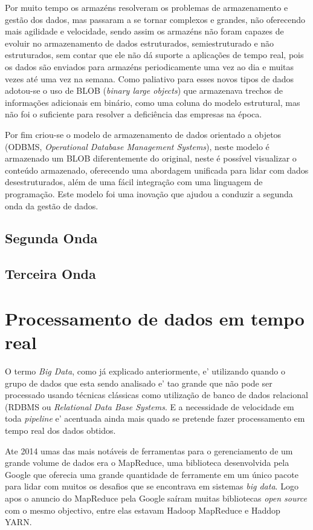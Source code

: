 Por muito tempo os armazéns resolveram os problemas de armazenamento e gestão dos dados, mas passaram a se tornar complexos e grandes, não oferecendo mais agilidade e velocidade, sendo assim os armazéns não foram capazes de evoluir no armazenamento de dados estruturados, semiestruturado e não estruturados, sem contar que ele não dá suporte a aplicações de tempo real, pois os dados são enviados para armazéns periodicamente uma vez ao dia e muitas vezes até uma vez na semana. Como paliativo para esses novos tipos de dados adotou-se o uso de BLOB (\textit{binary large objects}) que armazenava trechos de informações adicionais em binário, como uma coluna do modelo estrutural, mas não foi o suficiente para resolver a deficiência das empresas na época. 

Por fim criou-se o modelo de armazenamento de dados orientado a objetos (ODBMS, \textit{Operational Database Management Systems}), neste modelo é armazenado um BLOB diferentemente do original, neste é possível visualizar o conteúdo armazenado, oferecendo uma abordagem unificada para lidar com dados desestruturados, além de uma fácil integração com uma linguagem de programação. Este modelo foi uma inovação que ajudou a conduzir a segunda onda da gestão de dados.

\subsection{Segunda Onda}
\label{subsec:segundaonda}


\subsection{Terceira Onda}
\label{subsec:terceiraonda}

\section{Processamento de dados em tempo real}
O termo \textit{Big Data}, como já explicado anteriormente, e' utilizando quando o grupo de dados que esta sendo analisado e' tao grande que não pode ser processado usando técnicas clássicas como utilização de banco de dados relacional (RDBMS ou \textit{Relational Data Base Systems}. E a necessidade de velocidade em toda \textit{pipeline} e' acentuada ainda mais quado se pretende fazer processamento em tempo real dos dados obtidos.

Ate 2014 umas das mais notáveis de ferramentas para o gerenciamento de um grande volume de dados era o MapReduce, uma biblioteca desenvolvida pela Google que oferecia uma grande quantidade de ferramente em um único pacote para lidar com muitos os desafios que se encontrava em sistemas \textit{big data}. Logo apos o anuncio do MapReduce pela Google saíram muitas bibliotecas \textit{open source} com o mesmo objectivo, entre elas estavam  Hadoop MapReduce e Haddop YARN.

